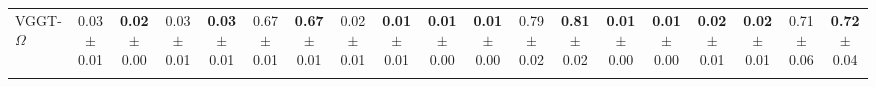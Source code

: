\begin{table}[ht]
{\begin{tabular}{l *{3}{cc} *{3}{cc} *{3}{cc}}
VGGT-$\Omega$ 
& \makecell{0.03 \\ {\tiny $\pm$ 0.01}} & \makecell{\textbf{0.02} \\ {\tiny $\pm$ 0.00}} 
& \makecell{0.03 \\ {\tiny $\pm$ 0.01}} & \makecell{\textbf{0.03} \\ {\tiny $\pm$ 0.01}} 
& \makecell{0.67 \\ {\tiny $\pm$ 0.01}} & \makecell{\textbf{0.67} \\ {\tiny $\pm$ 0.01}} 
& \makecell{0.02 \\ {\tiny $\pm$ 0.01}} & \makecell{\textbf{0.01} \\ {\tiny $\pm$ 0.01}} 
& \makecell{\textbf{0.01} \\ {\tiny $\pm$ 0.00}} & \makecell{\textbf{0.01} \\ {\tiny $\pm$ 0.00}} 
& \makecell{0.79 \\ {\tiny $\pm$ 0.02}} & \makecell{\textbf{0.81} \\ {\tiny $\pm$ 0.02}} 
& \makecell{\textbf{0.01} \\ {\tiny $\pm$ 0.00}} & \makecell{\textbf{0.01} \\ {\tiny $\pm$ 0.00}} 
& \makecell{\textbf{0.02} \\ {\tiny $\pm$ 0.01}} & \makecell{\textbf{0.02} \\ {\tiny $\pm$ 0.01}} 
& \makecell{0.71 \\ {\tiny $\pm$ 0.06}} & \makecell{\textbf{0.72} \\ {\tiny $\pm$ 0.04}} \\
\addlinespace[3pt]


\end{tabular}}
\end{table}
